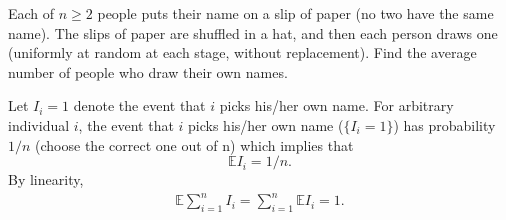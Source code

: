 
\setcounter{theorem}{37}
\begin{exercise} [BH.4.38] Each of $n \geq 2$ people puts their name on a slip of paper (no two have the same name). The slips of paper are shuffled in a hat, and then each person draws one (uniformly at random at each stage, without replacement). Find the average number of people who draw their own names.
\begin{solution}
    Let $I_i=1$ denote the event that $i$ picks his/her own name.  For arbitrary individual $i$, the event that $i$ picks his/her own name ($\{I_i=1\}$) has probability $1/n$ (choose the correct one out of n) which implies that 
	$$\mathbb{E}I_i =1/n.$$
	By linearity,
	\begin{align*}
		\mathbb{E} \sum_{i=1}^n I_i =	\sum_{i=1}^n \mathbb{E}I_i =1. 
	\end{align*} 
\end{solution}
\end{exercise}

